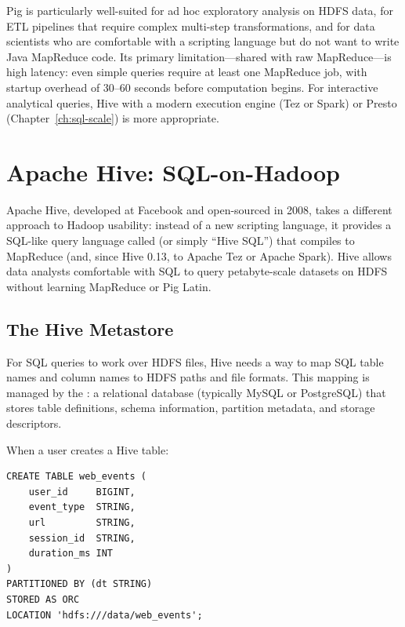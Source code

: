 Pig is particularly well-suited for ad hoc exploratory analysis on
HDFS data, for ETL pipelines that require complex multi-step
transformations, and for data scientists who are comfortable with
a scripting language but do not want to write Java MapReduce code.
Its primary limitation---shared with raw MapReduce---is high latency:
even simple queries require at least one MapReduce job, with startup
overhead of 30--60 seconds before computation begins. For interactive
analytical queries, Hive with a modern execution engine (Tez or Spark)
or Presto (Chapter~\ref{ch:sql-scale}) is more appropriate.

\section{Apache Hive: SQL-on-Hadoop}
\label{sec:hive}

Apache Hive, developed at Facebook and open-sourced in 2008, takes a
different approach to Hadoop usability: instead of a new scripting
language, it provides a SQL-like query language called 
(or simply ``Hive SQL'') that compiles to MapReduce (and, since Hive
0.13, to Apache Tez or Apache Spark). Hive allows data analysts
comfortable with SQL to query petabyte-scale datasets on HDFS without
learning MapReduce or Pig Latin.

\subsection{The Hive Metastore}
\label{subsec:metastore}

For SQL queries to work over HDFS files, Hive needs a way to map
SQL table names and column names to HDFS paths and file formats. This
mapping is managed by the : a relational database
(typically MySQL or PostgreSQL) that stores table definitions, schema
information, partition metadata, and storage descriptors.

When a user creates a Hive table:

\begin{lstlisting}[style=hiveql, caption={HiveQL: creating a partitioned ORC table}]
CREATE TABLE web_events (
    user_id     BIGINT,
    event_type  STRING,
    url         STRING,
    session_id  STRING,
    duration_ms INT
)
PARTITIONED BY (dt STRING)
STORED AS ORC
LOCATION 'hdfs:///data/web_events';
\end{lstlisting}

